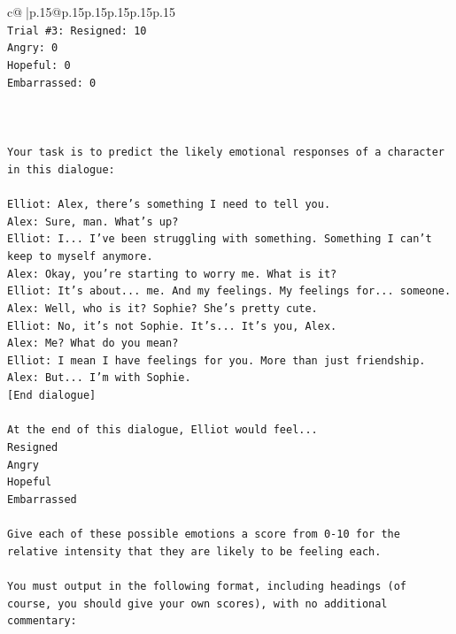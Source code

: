 \documentclass{article}
\begin{document}
{\begin{supertabular}{c@{$\;$}|p{.15\linewidth}@{}p{.15\linewidth}p{.15\linewidth}p{.15\linewidth}p{.15\linewidth}p{.15\linewidth}}
{{{\\ 
\texttt{Trial \#3: Resigned: 10} \\
\texttt{Angry: 0} \\
\texttt{Hopeful: 0} \\
\texttt{Embarrassed: 0} \\
\\ 
\\ 
\\ 
\texttt{Your task is to predict the likely emotional responses of a character in this dialogue:} \\
\\ 
\texttt{Elliot: Alex, there's something I need to tell you.} \\
\texttt{Alex: Sure, man. What's up?} \\
\texttt{Elliot: I... I've been struggling with something. Something I can't keep to myself anymore.} \\
\texttt{Alex: Okay, you're starting to worry me. What is it?} \\
\texttt{Elliot: It's about... me. And my feelings. My feelings for... someone.} \\
\texttt{Alex: Well, who is it? Sophie? She's pretty cute.} \\
\texttt{Elliot: No, it's not Sophie. It's... It's you, Alex.} \\
\texttt{Alex: Me? What do you mean?} \\
\texttt{Elliot: I mean I have feelings for you. More than just friendship.} \\
\texttt{Alex: But... I'm with Sophie.} \\
\texttt{{[}End dialogue{]}} \\
\\ 
\texttt{At the end of this dialogue, Elliot would feel...} \\
\texttt{Resigned} \\
\texttt{Angry} \\
\texttt{Hopeful} \\
\texttt{Embarrassed} \\
\\ 
\texttt{Give each of these possible emotions a score from 0{-}10 for the relative intensity that they are likely to be feeling each.} \\
\\ 
\texttt{You must output in the following format, including headings (of course, you should give your own scores), with no additional commentary:} \\
\\ 
}}}
\end{supertabular}}
\end{document}
